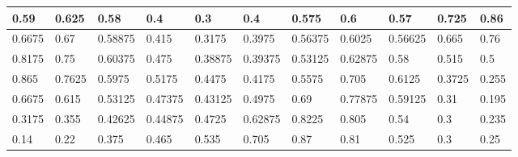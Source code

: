 \begin{tabular}{|l|l|l|l|l|l|l|l|l|l|l|}
\hline
0.59&0.625&0.58&0.4&0.3&0.4&0.575&0.6&0.57&0.725&0.86\\\hline
0.6675&0.67&0.58875&0.415&0.3175&0.3975&0.56375&0.6025&0.56625&0.665&0.76\\\hline
0.8175&0.75&0.60375&0.475&0.38875&0.39375&0.53125&0.62875&0.58&0.515&0.5\\\hline
0.865&0.7625&0.5975&0.5175&0.4475&0.4175&0.5575&0.705&0.6125&0.3725&0.255\\\hline
0.6675&0.615&0.53125&0.47375&0.43125&0.4975&0.69&0.77875&0.59125&0.31&0.195\\\hline
0.3175&0.355&0.42625&0.44875&0.4725&0.62875&0.8225&0.805&0.54&0.3&0.235\\\hline
0.14&0.22&0.375&0.465&0.535&0.705&0.87&0.81&0.525&0.3&0.25\\\hline
\end{tabular}

